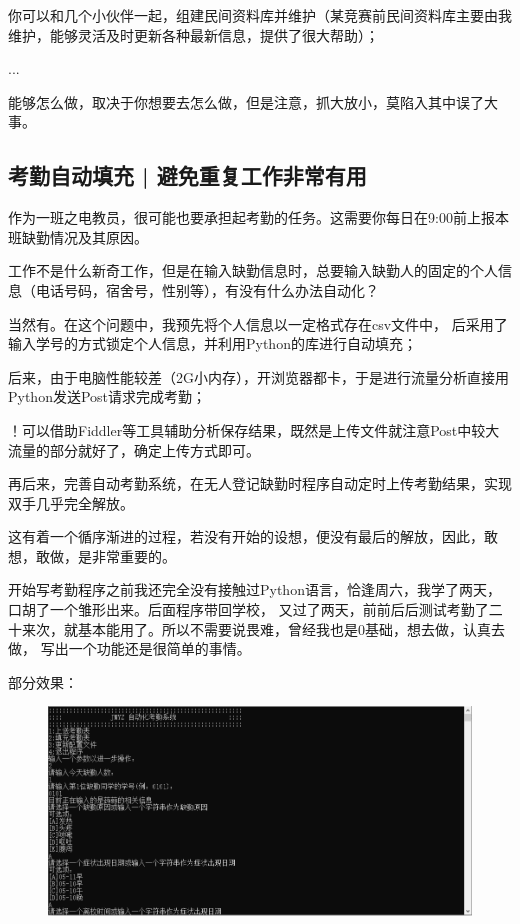 \documentclass{article}
\begin{document}
        你可以和几个小伙伴一起，组建民间资料库并维护（某竞赛前民间资料库主要由我维护，能够灵活及时更新各种最新信息，提供了很大帮助）；

        ...

        能够怎么做，取决于你想要去怎么做，但是注意，抓大放小，莫陷入其中误了大事。

        \subsection{考勤自动填充 | 避免重复工作非常有用}

        作为一班之电教员，很可能也要承担起考勤的任务。这需要你每日在9:00前上报本班缺勤情况及其原因。

        工作不是什么新奇工作，但是在输入缺勤信息时，总要输入缺勤人的固定的个人信息（电话号码，宿舍号，性别等），有没有什么办法自动化？

        当然有。在这个问题中，我预先将个人信息以一定格式存在csv文件中，
        后采用了输入学号的方式锁定个人信息，并利用Python的库进行自动填充；

        后来，由于电脑性能较差（2G小内存），开浏览器都卡，于是进行流量分析直接用Python发送Post请求完成考勤；

        ！可以借助Fiddler等工具辅助分析保存结果，既然是上传文件就注意Post中较大流量的部分就好了，确定上传方式即可。

        再后来，完善自动考勤系统，在无人登记缺勤时程序自动定时上传考勤结果，实现双手几乎完全解放。

        这有着一个循序渐进的过程，若没有开始的设想，便没有最后的解放，因此，敢想，敢做，是非常重要的。

        开始写考勤程序之前我还完全没有接触过Python语言，恰逢周六，我学了两天，口胡了一个雏形出来。后面程序带回学校，
        又过了两天，前前后后测试考勤了二十来次，就基本能用了。所以不需要说畏难，曾经我也是0基础，想去做，认真去做，
        写出一个功能还是很简单的事情。

        部分效果：

        \begin{figure}[htbp]
        \centering
        \includegraphics[scale=0.30]{2.3-p3.png}
        \end{figure}
\end{document}
